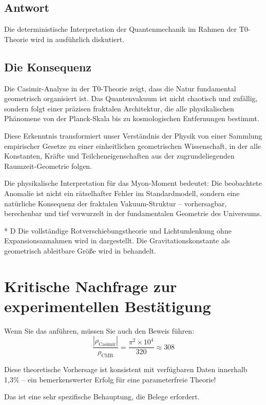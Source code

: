 \documentclass[12pt,a4paper]{article}
\theoremstyle{remark}
\newenvironment{answer}{\subsection*{Antwort}}{\vspace{1em}}
\begin{document}
\begin{answer}
	Die deterministische Interpretation der Quantenmechanik im Rahmen der T0-Theorie wird in \cite{pascher_deterministic_qm_2025} ausführlich diskutiert.
	
	\subsection{Die Konsequenz}
	
	Die Casimir-Analyse in der T0-Theorie zeigt, dass die Natur fundamental geometrisch organisiert ist. Das Quantenvakuum ist nicht chaotisch und zufällig, sondern folgt einer präzisen fraktalen Architektur, die alle physikalischen Phänomene von der Planck-Skala bis zu kosmologischen Entfernungen bestimmt.
	
	Diese Erkenntnis transformiert unser Verständnis der Physik von einer Sammlung empirischer Gesetze zu einer einheitlichen geometrischen Wissenschaft, in der alle Konstanten, Kräfte und Teilcheneigenschaften aus der zugrundeliegenden Raumzeit-Geometrie folgen.
	
	Die physikalische Interpretation für das Myon-Moment bedeutet: Die beobachtete Anomalie ist nicht ein rätselhafter Fehler im Standardmodell, sondern eine natürliche Konsequenz der fraktalen Vakuum-Struktur -- vorhersagbar, berechenbar und tief verwurzelt in der fundamentalen Geometrie des Universums.
	
	\begin{important}[title=Verwandte Arbeiten]
		* D Die vollständige Rotverschiebungstheorie und Lichtumlenkung ohne Expansionsannahmen wird in \cite{pascher_redshift_2025} dargestellt. Die Gravitationskonstante als geometrisch ableitbare Größe wird in \cite{pascher_gravitation_2025} behandelt.
	\end{important}
\end{answer}

\section{Kritische Nachfrage zur experimentellen Bestätigung}

\begin{question}
	Wenn Sie das anführen, müssen Sie auch den Beweis führen:
	\begin{equation}
		\frac{|\rho_{\text{Casimir}}|}{\rho_{\text{CMB}}} = \frac{\pi^2 \times 10^4}{320} \approx 308
	\end{equation}
	
	Diese theoretische Vorhersage ist konsistent mit verfügbaren Daten innerhalb 1{,}3\% -- ein bemerkenswerter Erfolg für eine parameterfreie Theorie!
	
	Das ist eine sehr spezifische Behauptung, die Belege erfordert.
\end{question}
\end{document}
